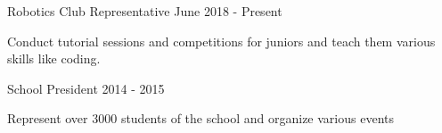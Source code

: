 

\begin{cventries}

  \projects
    {} %
    {Robotics Club Representative} %
    {June 2018 - Present} %
    {} %
    {
      \begin{por} %
        \item []{Conduct tutorial sessions and competitions for juniors and teach them various skills like coding. }
      \end{por}
    }

\projects
    {} %
    {School President} %
    {2014 - 2015} %
    {} %
    {
      \begin{por} %
        \item []{Represent over 3000 students of the school and organize various events}
      \end{por}
    }

\end{cventries}
